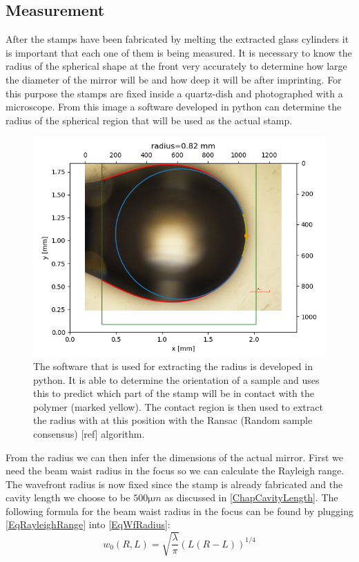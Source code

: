 \subsection{Measurement}
After the stamps have been fabricated by melting the extracted glass cylinders it is important that each one of them is being measured. It is necessary to know the radius of the spherical shape at the front very accurately to determine how large the diameter of the mirror will be and how deep it will be after imprinting. For this purpose the stamps are fixed inside a quartz-dish and photographed with a microscope. From this image a software developed in python can determine the radius of the spherical region that will be used as the actual stamp.

\begin{figure}[H]
	\includegraphics[scale=0.6]{source/radius_analysis}
	\caption{The software that is used for extracting the radius is developed in python. It is able to determine the orientation of a sample and uses this to predict which part of the stamp will be in contact with the polymer (marked yellow). The contact region is then used to extract the radius with at this position with the Ransac (Random sample consensus) [ref] algorithm.}
\end{figure}
From the radius we can then infer the dimensions of the actual mirror. First we need the beam waist radius in the focus so we can calculate the Rayleigh range. The wavefront radius is now fixed since the stamp is already fabricated and the cavity length we choose to be $500\si{\micro m}$ as discussed in \autoref{ChapCavityLength}. The following formula for the beam waist radius in the focus can be found by plugging \autoref{EqRayleighRange} into \autoref{EqWfRadius}:
\begin{equation}
	w_0(R, L)=\sqrt{\frac{\lambda}{\pi}}\left(L(R-L)\right)^{1/4}
\end{equation}


